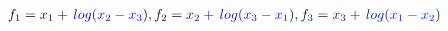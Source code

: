 \documentclass[12pt]{article}
\begin{document}
\makeatletter
\renewcommand*{\@textcolor}[3]{%
  \protect\leavevmode
  \begingroup
    \color#1{#2}#3%
  \endgroup
}
\makeatother
\begin{displaymath}
\begin{array} {l} \mathcolor[RGB]{0,0,15}{\textstyle} { \mathcolor[RGB]{0,0,30}{f} _ { \mathcolor[RGB]{0,0,45}{1} } \mathcolor[RGB]{0,0,60}{=} \mathcolor[RGB]{0,0,75}{x} _ { \mathcolor[RGB]{0,0,90}{1} } \mathcolor[RGB]{0,0,105}{+} \mathcolor[RGB]{0,0,120}{\operatorname*} { \mathcolor[RGB]{0,0,135}{l} \mathcolor[RGB]{0,0,150}{o} \mathcolor[RGB]{0,0,165}{g} } \mathcolor[RGB]{0,0,180}{(} \mathcolor[RGB]{0,0,195}{x} _ { \mathcolor[RGB]{0,0,210}{2} } \mathcolor[RGB]{0,0,225}{-} \mathcolor[RGB]{0,0,240}{x} _ { \mathcolor[RGB]{0,0,255}{3} } \mathcolor[RGB]{0,15,0}{)} \mathcolor[RGB]{0,15,15}{,} \mathcolor[RGB]{0,15,30}{f} _ { \mathcolor[RGB]{0,15,45}{2} } \mathcolor[RGB]{0,15,60}{=} \mathcolor[RGB]{0,15,75}{x} _ { \mathcolor[RGB]{0,15,90}{2} } \mathcolor[RGB]{0,15,105}{+} \mathcolor[RGB]{0,15,120}{\operatorname*} { \mathcolor[RGB]{0,15,135}{l} \mathcolor[RGB]{0,15,150}{o} \mathcolor[RGB]{0,15,165}{g} } \mathcolor[RGB]{0,15,180}{(} \mathcolor[RGB]{0,15,195}{x} _ { \mathcolor[RGB]{0,15,210}{3} } \mathcolor[RGB]{0,15,225}{-} \mathcolor[RGB]{0,15,240}{x} _ { \mathcolor[RGB]{0,15,255}{1} } \mathcolor[RGB]{0,30,0}{)} \mathcolor[RGB]{0,30,15}{,} \mathcolor[RGB]{0,30,30}{f} _ { \mathcolor[RGB]{0,30,45}{3} } \mathcolor[RGB]{0,30,60}{=} \mathcolor[RGB]{0,30,75}{x} _ { \mathcolor[RGB]{0,30,90}{3} } \mathcolor[RGB]{0,30,105}{+} \mathcolor[RGB]{0,30,120}{\operatorname*} { \mathcolor[RGB]{0,30,135}{l} \mathcolor[RGB]{0,30,150}{o} \mathcolor[RGB]{0,30,165}{g} } \mathcolor[RGB]{0,30,180}{(} \mathcolor[RGB]{0,30,195}{x} _ { \mathcolor[RGB]{0,30,210}{1} } \mathcolor[RGB]{0,30,225}{-} \mathcolor[RGB]{0,30,240}{x} _ { \mathcolor[RGB]{0,30,255}{2} } \mathcolor[RGB]{0,45,0}{)} } \end{array}
\end{displaymath}
\end{document}
